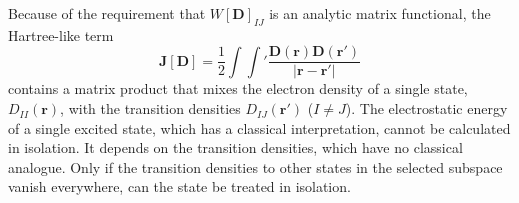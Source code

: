\documentclass[journal=jpclcd,manuscript=letter]{achemso}
\DeclareMathOperator{\tr}{tr}
\newcommand\m[1]{\mathbf{#1}}
\renewcommand\vec[1]{\mathbf{#1}}
\begin{document}
Because of the requirement that $W[\m{D}]_{IJ}$ is an analytic matrix functional, the Hartree-like term 
\begin{equation}
\m{J}[\m{D}] = \frac{1}{2} \int \int' \frac{\m{D}(\vec{r}) \m{D}(\vec{r}')}{\vert \vec{r} - \vec{r}' \vert} \label{eqn:Hartree_term}
\end{equation}
contains a matrix product that mixes the electron density of a single state,
$D_{II}(\vec{r})$, with the transition densities $D_{IJ}(\vec{r}')$ ($I \neq J$).
The electrostatic energy of a single excited state, which has a classical interpretation, cannot be calculated in
isolation. It depends on the transition densities, which have no classical analogue.
Only if the transition densities to other states in the selected subspace vanish everywhere, can the state be
treated in isolation. 
\end{document}
